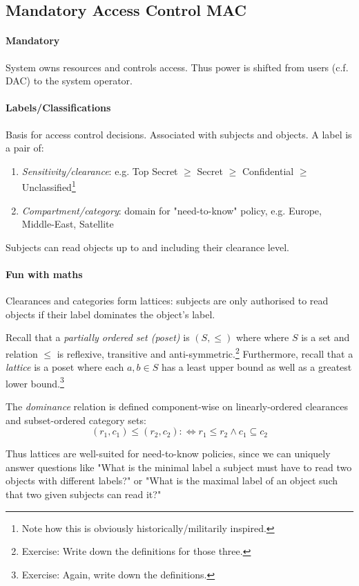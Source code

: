 \subsection{Mandatory Access Control MAC}

\paragraph{Mandatory} System owns resources and controls access. Thus power is shifted from users (c.f. DAC) to the system operator.

\paragraph{Labels/Classifications} Basis for access control decisions. Associated with subjects and objects. A label is a pair of:
\begin{enumerate}
    \item \emph{Sensitivity/clearance}: e.g. Top Secret $\geq$ Secret $\geq$ Confidential $\geq$ Unclassified\footnote{Note how this is obviously historically/militarily inspired.}
    \item \emph{Compartment/category}: domain for "need-to-know" policy, e.g. Europe, Middle-East, Satellite
\end{enumerate}
Subjects can read objects up to and including their clearance level.

\paragraph{Fun with maths} %
Clearances and categories form lattices: subjects are only authorised to read objects if their label dominates the object's label.

Recall that a \emph{partially ordered set (poset)} is $(S, \leq)$ where where $S$ is a set and relation $\leq$ is reflexive, transitive and anti-symmetric.\footnote{Exercise: Write down the definitions for those three.} 
Furthermore, recall that a \emph{lattice} is a poset where each $a,b \in S$ has a least upper bound as well as a greatest lower bound.\footnote{Exercise: Again, write down the definitions.}

The \emph{dominance} relation is defined component-wise on linearly-ordered clearances and subset-ordered category sets:
$$ (r_1, c_1) \leq (r_2, c_2) :\Leftrightarrow r_1 \leq r_2 \wedge c_1 \subseteq c_2$$

Thus lattices are well-suited for need-to-know policies, since we can uniquely answer questions like "What is the minimal label a subject must have to read two objects with different labels?" or "What is the maximal label of an object such that two given subjects can read it?"

